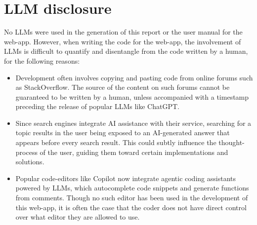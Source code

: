 \documentclass[letterpaper,11pt]{article}
\begin{document}







\section*{LLM disclosure}

No LLMs were used in the generation of this report or the user manual for the web-app. However, when writing the code for the web-app, the involvement of LLMs is difficult to quantify and disentangle from the code written by a human, for the following reasons:

\begin{itemize}
	\item Development often involves copying and pasting code from online forums such as StackOverflow. The source of the content on such forums cannot be guaranteed to be written by a human, unless accompanied with a timestamp preceding the release of popular LLMs like ChatGPT.
	\item Since search engines integrate AI assistance with their service, searching for a topic results in the user being exposed to an AI-generated answer that appears before every search result. This could subtly influence the thought-process of the user, guiding them toward certain implementations and solutions.
	\item Popular code-editors like Copilot now integrate agentic coding assistants powered by LLMs, which autocomplete code snippets and generate functions from comments. Though no such editor has been used in the development of this web-app, it is often the case that the coder does not have direct control over what editor they are allowed to use.
\end{itemize}
\end{document}
